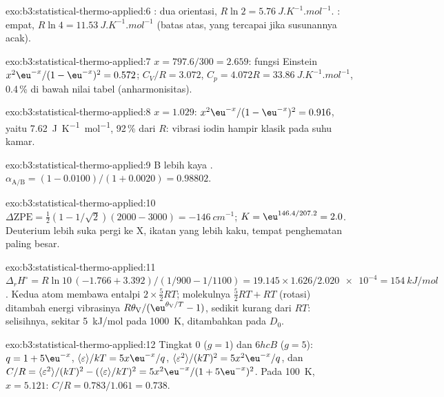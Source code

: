 \begin{solution}{exo:b3:statistical-thermo-applied:6}
: dua orientasi, $R\ln2 = \qty{5.76}{J.K^{-1}.mol^{-1}}$. : empat,
$R\ln4 =
\qty{11.53}{J.K^{-1}.mol^{-1}}$ (batas atas, yang tercapai jika susunannya acak).
\end{solution}

\begin{solution}{exo:b3:statistical-thermo-applied:7}
$x = 797.6/300 = 2.659$: fungsi Einstein $x^2\eu^{-x}/(1 - \eu^{-x})^2 = 0.572$;
$C_V/R = 3.072$, $C_p = 4.072R = \qty{33.86}{J.K^{-1}.mol^{-1}}$, 0.4\,\% di bawah
nilai tabel (anharmonisitas).
\end{solution}

\begin{solution}{exo:b3:statistical-thermo-applied:8}
$x = 1.029$: $x^2\eu^{-x}/(1 - \eu^{-x})^2 = 0.916$, yaitu \qty{7.62}{J.K^{-1}.mol^{-1}},
92\,\% dari $R$: vibrasi iodin hampir klasik pada suhu kamar.
\end{solution}

\begin{solution}{exo:b3:statistical-thermo-applied:9}
B lebih kaya . $\alpha_{\mathrm{A/B}} = (1 - 0.0100)/(1 + 0.0020) = 0.98802$.
\end{solution}

\begin{solution}{exo:b3:statistical-thermo-applied:10}
$\Delta\mathrm{ZPE} = \frac12(1 - 1/\sqrt2)(2000 - 3000) = \qty{-146}{cm^{-1}}$;
$K = \eu^{146.4/207.2} = 2.0$. Deuterium lebih suka pergi ke X, ikatan yang
lebih kaku, tempat penghematan  paling besar.
\end{solution}

\begin{solution}{exo:b3:statistical-thermo-applied:11}
$\Delta_rH^\circ = R\ln10\,(-1.766 + 3.392)/(1/900 - 1/1100) = 19.145 \times 1.626/\num{2.020e-4} =
\qty{154}{kJ/mol}$. Kedua atom membawa entalpi $2 \times \frac52RT$; molekulnya
$\frac52RT + RT$ (rotasi) ditambah energi vibrasinya
$R\theta_{\mathrm V}/(\eu^{\theta_{\mathrm V}/T} - 1)$, sedikit kurang dari $RT$: selisihnya,
sekitar \qty{5}{kJ/mol} pada \qty{1000}{K}, ditambahkan pada $D_0$.
\end{solution}

\begin{solution}{exo:b3:statistical-thermo-applied:12}
Tingkat 0 ($g = 1$) dan $6hcB$ ($g = 5$): $q = 1 + 5\eu^{-x}$,
$\langle\varepsilon\rangle/kT = 5x\eu^{-x}/q$, $\langle\varepsilon^2\rangle/(kT)^2 =
5x^2\eu^{-x}/q$, dan $C/R = \langle\varepsilon^2\rangle/(kT)^2 - (\langle\varepsilon\rangle/kT)^2 = 5x^2\eu^{-x}/(1 + 5\eu^{-x})^2$.
Pada \qty{100}{K}, $x = 5.121$: $C/R = 0.783/1.061 = 0.738$.
\end{solution}

